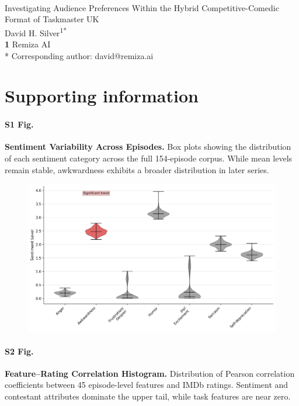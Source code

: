 \documentclass[10pt,letterpaper]{article}
\begin{document}
\vspace*{0.2in}

\begin{flushleft}
{\Large
\textbf{}
}
\newline
\\
Investigating Audience Preferences Within the Hybrid Competitive-Comedic Format of Taskmaster UK
\newline
\\
David H. Silver\textsuperscript{1*}
\\
\bigskip
\textbf{1} Remiza AI\\
\bigskip
* Corresponding author: david@remiza.ai
\end{flushleft}

\section*{Supporting information}

\paragraph*{S1 Fig.}
\label{S1_Fig}
{\bf Sentiment Variability Across Episodes.} 
Box plots showing the distribution of each sentiment category across the full 154-episode corpus. While mean levels remain stable, awkwardness exhibits a broader distribution in later series.

\begin{figure}[!h]
\centering
\includegraphics[width=\linewidth]{supfigure/figure7b.png}
\end{figure}
\FloatBarrier

\paragraph*{S2 Fig.}
\label{S2_Fig}
{\bf Feature–Rating Correlation Histogram.} 
Distribution of Pearson correlation coefficients between 45 episode-level features and IMDb ratings. Sentiment and contestant attributes dominate the upper tail, while task features are near zero.
\end{document}
